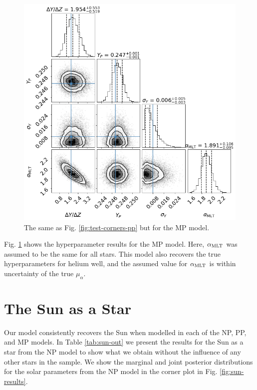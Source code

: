 \begin{figure}
    \centering
    \includegraphics[width=0.82\linewidth]{figures/corner_plot_mp_truths.png}
    \caption{The same as Fig. \ref{fig:test-corners-pp} but for the MP model.}
    \label{fig:test-corners-mp} 
\end{figure}

Fig. \ref{fig:test-corners-mp} shows the hyperparameter results for the MP model. Here, ${\alpha_\mathrm{MLT}}$ was assumed to be the same for all stars. This model also recovers the true hyperparameters for helium well, and the assumed value for ${\alpha_\mathrm{MLT}}$ is within uncertainty of the true $\mu_\alpha$.

\section{The Sun as a Star}\label{sec:sun-res}



Our model consistently recovers the Sun when modelled in each of the NP, PP, and MP models. In Table \ref{tab:sun-out} we present the results for the Sun as a star from the NP model to show what we obtain without the influence of any other stars in the sample. We show the marginal and joint posterior distributions for the solar parameters from the NP model in the corner plot in Fig. \ref{fig:sun-results}.

